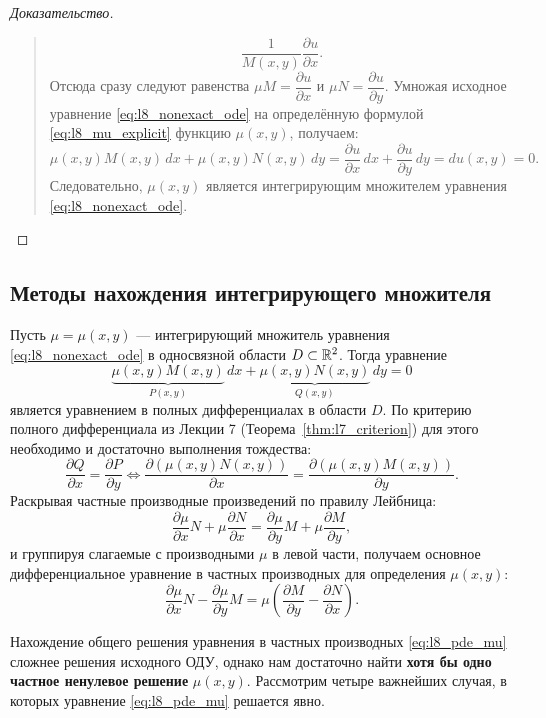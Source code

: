 \begin{proof}[Доказательство]
\begin{quote}
\begin{equation}
            \frac{1}{M(x, y)} \frac{\partial u}{\partial x}. \tag{7}
        \end{equation}
        Отсюда сразу следуют равенства $\mu M = \dfrac{\partial u}{\partial x}$
        и $\mu N = \dfrac{\partial u}{\partial y}$. Умножая исходное уравнение
        \eqref{eq:l8_nonexact_ode} на определённую формулой
        \eqref{eq:l8_mu_explicit} функцию $\mu(x, y)$, получаем:
        \[
            \mu(x, y) M(x, y) \, dx + \mu(x, y) N(x, y) \, dy =
            \frac{\partial u}{\partial x} \, dx +
            \frac{\partial u}{\partial y} \, dy = du(x, y) = 0.
        \]
        Следовательно, $\mu(x, y)$ является интегрирующим множителем уравнения
        \eqref{eq:l8_nonexact_ode}.
    \end{quote}
\end{proof}

\subsection{Методы нахождения интегрирующего множителя}

Пусть $\mu = \mu(x, y)$ — интегрирующий множитель уравнения
\eqref{eq:l8_nonexact_ode} в односвязной области $D \subset \mathbb{R}^2$. Тогда
уравнение
\[
    \underbrace{\mu(x, y) M(x, y)}_{P(x, y)} \, dx +
    \underbrace{\mu(x, y) N(x, y)}_{Q(x, y)} \, dy = 0
\]
является уравнением в полных дифференциалах в области $D$. По критерию полного
дифференциала из Лекции 7 (Теорема~\ref{thm:l7_criterion}) для
этого необходимо и достаточно выполнения тождества:
\[
    \frac{\partial Q}{\partial x} = \frac{\partial P}{\partial y} \iff
    \frac{\partial \left(\mu(x, y) N(x, y)\right)}{\partial x} =
    \frac{\partial \left(\mu(x, y) M(x, y)\right)}{\partial y}.
\]
Раскрывая частные производные произведений по правилу Лейбница:
\[
    \frac{\partial \mu}{\partial x} N + \mu \frac{\partial N}{\partial x} =
    \frac{\partial \mu}{\partial y} M + \mu \frac{\partial M}{\partial y},
\]
и группируя слагаемые с производными $\mu$ в левой части, получаем основное
дифференциальное уравнение в частных производных для определения $\mu(x, y)$:
\begin{equation} \label{eq:l8_pde_mu}
    \frac{\partial \mu}{\partial x} N - \frac{\partial \mu}{\partial y} M =
    \mu \left(\frac{\partial M}{\partial y} -
    \frac{\partial N}{\partial x}\right). \tag{8}
\end{equation}

Нахождение общего решения уравнения в частных производных \eqref{eq:l8_pde_mu}
сложнее решения исходного ОДУ, однако нам достаточно найти \textbf{хотя бы одно
частное ненулевое решение} $\mu(x, y)$. Рассмотрим четыре важнейших случая, в
которых уравнение \eqref{eq:l8_pde_mu} решается явно.

